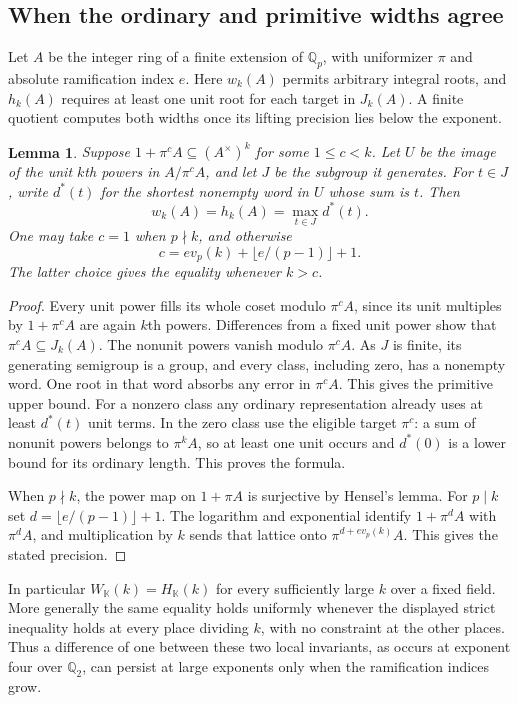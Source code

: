\documentclass[11pt,letterpaper]{article}
\newtheorem{lemma}[lemma]{Lemma}
\theoremstyle{definition}
\numberwithin{equation}{section}
\begin{document}
\subsection{When the ordinary and primitive widths agree}
\label{sec:local-precision}
Let $A$ be the integer ring of a finite extension of $\mathbb Q_p$,
with uniformizer $\pi$ and absolute ramification index $e$.
Here $w_k(A)$ permits arbitrary integral roots, and $h_k(A)$ requires at
least one unit root for each target in $J_k(A)$. A finite quotient
computes both widths once its lifting precision lies below the exponent.

\begin{lemma}\label{lem:precision-widths}
Suppose $1+\pi^c A\subseteq(A^\times)^k$ for some $1\le c<k$.
Let $U$ be the image of the unit $k$th powers in $A/\pi^cA$, and
let $J$ be the subgroup it generates. For $t\in J$, write $d^*(t)$
for the shortest \emph{nonempty} word in $U$ whose sum is $t$.
Then
\[
                   w_k(A)=h_k(A)=\max_{t\in J}d^*(t).
\]
One may take $c=1$ when $p\nmid k$, and otherwise
\[
              c=e v_p(k)+\lfloor e/(p-1)\rfloor+1 .
\]
The latter choice gives the equality whenever $k>c$.
\end{lemma}
\begin{proof}
Every unit power fills its whole coset modulo $\pi^cA$, since its
unit multiples by $1+\pi^cA$ are again $k$th powers.
Differences from a fixed unit power show that $\pi^c A\subseteq J_k(A)$.
The nonunit powers vanish modulo $\pi^c A$. As $J$ is finite, its
generating semigroup is a group, and every class, including zero, has
a nonempty word. One root in that word absorbs any error in $\pi^c A$.
This gives the primitive upper bound. For a nonzero class any ordinary
representation already uses at least $d^*(t)$ unit terms. In the zero
class use the eligible target $\pi^c$: a sum of nonunit powers belongs to
$\pi^k A$, so at least one unit occurs and $d^*(0)$ is a lower bound for
its ordinary length. This proves the formula.

When $p\nmid k$, the power map on $1+\pi A$ is surjective by Hensel's
lemma. For $p\mid k$ set $d=\lfloor e/(p-1)\rfloor+1$.
The logarithm and exponential identify $1+\pi^d A$ with $\pi^d A$,
and multiplication by $k$ sends that lattice onto
$\pi^{d+e v_p(k)}A$. This gives the stated precision.
\end{proof}

In particular $W_{\mathbb K}(k)=H_{\mathbb K}(k)$ for every
sufficiently large $k$ over a fixed field. More generally the same equality
holds uniformly whenever the displayed strict inequality holds at every
place dividing $k$, with no constraint at the other places. Thus a
difference of one between these two local invariants, as occurs at
exponent four over $\mathbb Q_2$, can persist at large exponents only
when the ramification indices grow.
\end{document}
